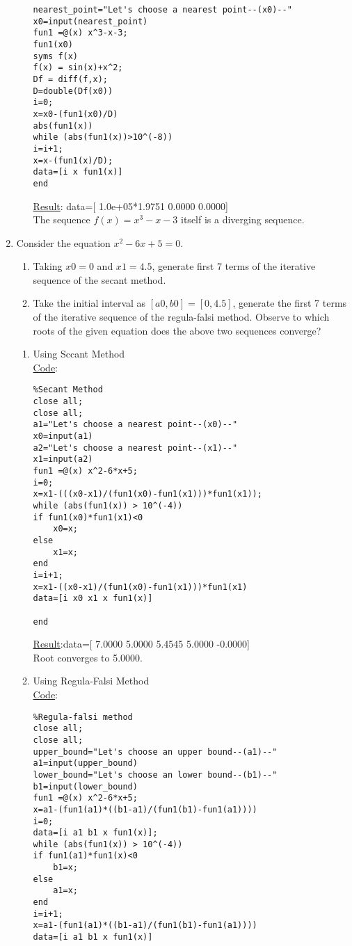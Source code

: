 \documentclass{article}
\begin{document}
\begin{enumerate}
\begin{enumerate}
\begin{lstlisting}
nearest_point="Let's choose a nearest point--(x0)--"
x0=input(nearest_point)
fun1 =@(x) x^3-x-3;
fun1(x0)
syms f(x)
f(x) = sin(x)+x^2;
Df = diff(f,x);
D=double(Df(x0))
i=0;
x=x0-(fun1(x0)/D)
abs(fun1(x))
while (abs(fun1(x))>10^(-8))
i=i+1;
x=x-(fun1(x)/D);
data=[i x fun1(x)]
end  
\end{lstlisting}
\underline{Result}: data=[ 1.0e+05*1.9751    0.0000    0.0000]\\
The sequence $f(x)=x^3-x-3$ itself is a diverging sequence.
\end{enumerate}
\item Consider the equation $x^2-6x+5=0$.
\begin{enumerate}
\item Taking $x0=0$ and $x1=4.5$, generate first 7 terms of the iterative sequence of the secant method.
\item Take the initial interval as $[a0, b0]=[0, 4.5]$, generate the first 7 terms of the iterative sequence of the regula-falsi method.
Observe to which roots of the given equation does the above two sequences converge?
\end{enumerate}
\begin{enumerate}
    \item Using Sccant Method \\
    \underline{Code}:
    \begin{lstlisting}
%Secant Method 
close all;
close all;
a1="Let's choose a nearest point--(x0)--"
x0=input(a1)
a2="Let's choose a nearest point--(x1)--"
x1=input(a2)
fun1 =@(x) x^2-6*x+5;
i=0;
x=x1-(((x0-x1)/(fun1(x0)-fun1(x1)))*fun1(x1));
while (abs(fun1(x)) > 10^(-4))
if fun1(x0)*fun1(x1)<0
    x0=x;
else
    x1=x;
end
i=i+1;
x=x1-((x0-x1)/(fun1(x0)-fun1(x1)))*fun1(x1)
data=[i x0 x1 x fun1(x)]

end  
    \end{lstlisting}
\underline{Result}:data=[ 7.0000    5.0000    5.4545    5.0000   -0.0000]\\
Root converges to 5.0000.
\item Using Regula-Falsi Method\\
\underline{Code}:
\begin{lstlisting}
%Regula-falsi method
close all;
close all;
upper_bound="Let's choose an upper bound--(a1)--"
a1=input(upper_bound)
lower_bound="Let's choose an lower bound--(b1)--"
b1=input(lower_bound)
fun1 =@(x) x^2-6*x+5;
x=a1-(fun1(a1)*((b1-a1)/(fun1(b1)-fun1(a1))))
i=0;
data=[i a1 b1 x fun1(x)];
while (abs(fun1(x)) > 10^(-4))
if fun1(a1)*fun1(x)<0
    b1=x;
else
    a1=x;
end
i=i+1;
x=a1-(fun1(a1)*((b1-a1)/(fun1(b1)-fun1(a1))))
data=[i a1 b1 x fun1(x)]


\end{lstlisting}
\end{enumerate}
\end{enumerate}
\end{document}
